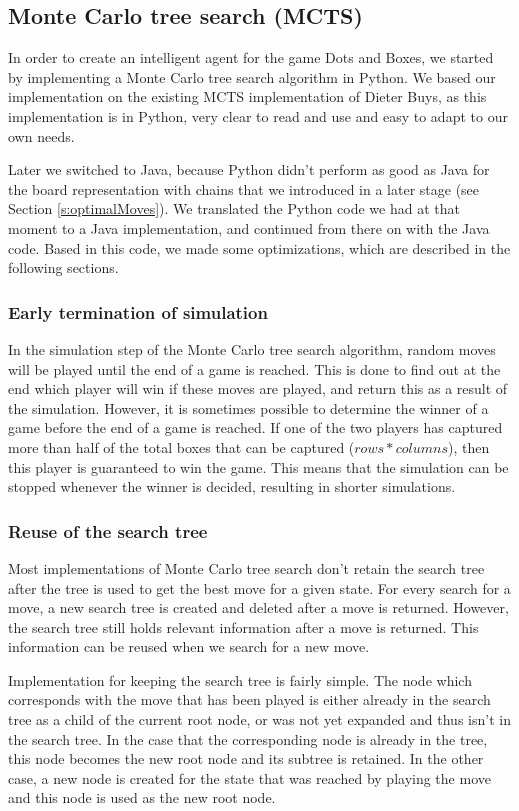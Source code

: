 \subsection{Monte Carlo tree search (MCTS)\label{s:mcts}}
	In order to create an intelligent agent for the game Dots and Boxes, we started by implementing a Monte Carlo tree search algorithm in Python. We based our implementation on the existing MCTS implementation of Dieter Buys\cite{DieterBuys:MCTS}, as this implementation is in Python, very clear to read and use and easy to adapt to our own needs.
	
	Later we switched to Java, because Python didn't perform as good as Java for the board representation with chains that we introduced in a later stage (see Section \ref{s:optimalMoves}). We translated the Python code we had at that moment to a Java implementation, and continued from there on with the Java code. Based in this code, we made some optimizations, which are described in the following sections.
	
	\subsubsection{Early termination of simulation}
	In the simulation step of the Monte Carlo tree search algorithm, random moves will be played until the end of a game is reached. This is done to find out at the end which player will win if these moves are played, and return this as a result of the simulation. However, it is sometimes possible to determine the winner of a game before the end of a game is reached. If one of the two players has captured more than half of the total boxes that can be captured ($rows * columns$), then this player is guaranteed to win the game. This means that the simulation can be stopped whenever the winner is decided, resulting in shorter simulations.
	
	\subsubsection{Reuse of the search tree}
	Most implementations of Monte Carlo tree search don't retain the search tree after the tree is used to get the best move for a given state. For every search for a move, a new search tree is created and deleted after a move is returned.
	However, the search tree still holds relevant information after a move is returned. This information can be reused when we search for a new move. 
	
	Implementation for keeping the search tree is fairly simple. The node which corresponds with the move that has been played is either already in the search tree as a child of the current root node, or was not yet expanded and thus isn't in the search tree. In the case that the corresponding node is already in the tree, this node becomes the new root node and its subtree is retained. In the other case, a new node is created for the state that was reached by playing the move and this node is used as the new root node.
	

